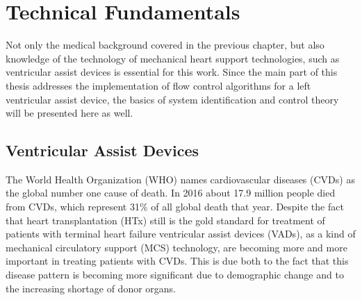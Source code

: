 \chapter{Technical Fundamentals}
Not only the medical background covered in the previous chapter, but also knowledge of the technology of mechanical heart support technologies, such as ventricular assist devices is essential for this work.
Since the main part of this thesis addresses the implementation of flow control algorithms for a left ventricular assist device, the basics of system identification and control theory will be presented here as well.

\section{Ventricular Assist Devices}
The World Health Organization (WHO) names cardiovascular diseases (CVDs) as the global number one cause of death. In 2016 about 17.9 million people died from    CVDs, which represent 31{\%} of all global death that year.\cite{WHO} Despite the fact that heart transplantation (HTx) still is the gold standard for treatment of patients with terminal heart failure \cite{VAD2} ventricular assist devices (VADs), as a kind of mechanical circulatory support (MCS) technology, are becoming more and more important in treating patients with CVDs. This is due both to the fact that this disease pattern is becoming more significant due to demographic change and to the increasing shortage of donor organs.\cite{VAD7}

